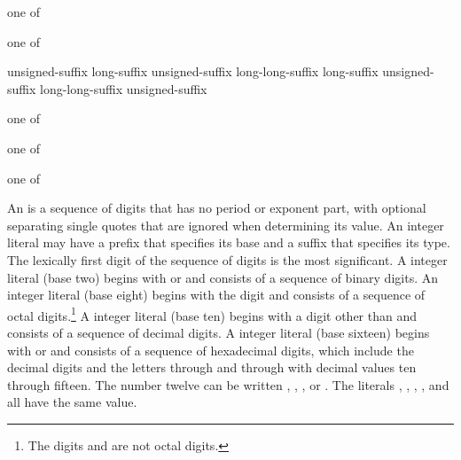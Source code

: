 \begin{bnf}
 \textnormal{one of}\br
\end{bnf}

\begin{bnf}
 \textnormal{one of}\br
    \br
    \br
\end{bnf}

\begin{bnf}
\br
    unsigned-suffix long-suffix\opt \br
    unsigned-suffix long-long-suffix\opt \br
    long-suffix unsigned-suffix\opt \br
    long-long-suffix unsigned-suffix\opt
\end{bnf}

\begin{bnf}
 \textnormal{one of}\br
\end{bnf}

\begin{bnf}
 \textnormal{one of}\br
\end{bnf}

\begin{bnf}
 \textnormal{one of}\br
\end{bnf}

\pnum
{}%
%
%
%
%
%
%
%
An  is a sequence of digits that has no period
or exponent part, with optional separating single quotes that are ignored
when determining its value. An integer literal may have a prefix that specifies
its base and a suffix that specifies its type. The lexically first digit
of the sequence of digits is the most significant.
A  integer literal (base two) begins with
 or  and consists of a sequence of binary digits.
An  integer
literal (base eight) begins with the digit  and consists of a
sequence of octal digits.\footnote{The digits  and  are not octal digits. }
A 
integer literal (base ten) begins with a digit other than  and
consists of a sequence of decimal digits.
A  integer literal (base sixteen) begins with
 or  and consists of a sequence of hexadecimal
digits, which include the decimal digits and the letters 
through  and  through  with decimal values
ten through fifteen.
\enterexample The number twelve can be written , ,
, or . The literals ,
, , , and
 all have the same value.
\exitexample

